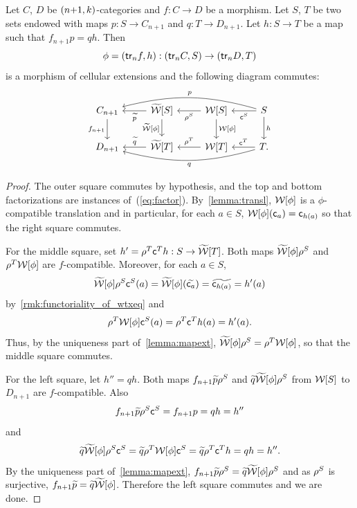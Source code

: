 \begin{lemma}\label{lemma:main_diagram}
    Let $C$, $D$ be $(n{+}1,k)$-categories and $f:C\to D$ be a
    morphism. Let $S$, $T$ be two sets endowed with maps $p:S\to
    C_{n+1}$ and $q:T\to D_{n+1}$. Let $h:S\to T$ be a map such that
    $f_{n+1}p=qh$. Then
    \[ \phi=(\mathsf{tr}_{n} f,h):(\mathsf{tr}_{n}
      C,S)\to(\mathsf{tr}_{n} D,T)\]
is a morphism of cellular extensions
    and the following diagram commutes:
    \begin{equation}
      \label{eq:main_diagram}
      \begin{tikzcd}
       C_{n+1} \ar[d,"f_{n+1}"']& \wtxeq S\ar[l,"\fcls{p}"]\ar[d,"\wtxeq\phi"'] & \wtx S
      \ar[l,"\cans{S}"]\ar[d,"\wtx\phi"] & S\ar[l,"\finc{S}"]\ar[d,"h"]
      \ar[lll,bend right=15,"p"']\\
      D_{n+1} & \wtxeq T\ar[l,"\fcls{q}"'] & \wtx T
      \ar[l,"\cans{T}"'] & T.\ar[l,"\finc{T}"'] \ar[lll,bend left=15,"q"]
      \end{tikzcd}
     \end{equation}
   \end{lemma}
   \begin{proof}
     The outer square commutes by hypothesis, and the top and bottom
     factorizations are instances
     of~(\ref{eq:factor}). By~\cref{lemma:transl}, $\mathcal{W}[\phi]$ is a
     $\phi$-compatible translation and in particular, for each $a\in
     S$, $\mathcal{W}[\phi](\mathsf{c}_{a})=\mathsf{c}_{h(a)}$ so that the right square
     commutes.

     For the middle square, set $h'=\rho^{T}\mathsf{c}^{T}h:S\to\widetilde{\mathcal{W}}[T]$. Both maps
     $\widetilde{\mathcal{W}}[\phi]\rho^{S}$ and $\rho^{T}\mathcal{W}[\phi]$ are
     $f$-compatible. Moreover, for each $a\in S$,
\[\widetilde{\mathcal{W}}[\phi]\rho^{S}\mathsf{c}^{S}(a)=\widetilde{\mathcal{W}}[\phi](\widetilde{\mathsf{c}_{a}})=\widetilde{\mathsf{c}_{h(a)}}=h'(a)\]
by~\cref{rmk:functoriality_of_wtxeq} and
\[
\rho^{T}\mathcal{W}[\phi]\mathsf{c}^{S}(a)=\rho^{T}\mathsf{c}^{T} h(a)=h'(a).
  \]
Thus, by the
     uniqueness part of~\cref{lemma:mapext}, $\widetilde{\mathcal{W}}[\phi]\rho^{S}=\rho^{T}\mathcal{W}[\phi]$, so that the middle square commutes.

     For the left square, let
     $h''=qh$. Both maps $f_{n+1}\widetilde{p}\rho^{S}$ and $\widetilde{q}\widetilde{\mathcal{W}}[\phi]\rho^{S}$ from $\mathcal{W}[S]$ to $D_{n+1}$ are $f$-compatible. Also
     \[
       f_{n+1}\widetilde{p}\rho^{S}\mathsf{c}^{S}=f_{n+1}p=qh=h''
     \]
      and
      \[
      \widetilde{q}\widetilde{\mathcal{W}}[\phi]\rho^{S}\mathsf{c}^{S}=\widetilde{q}\rho^{T}\mathcal{W}[\phi]\mathsf{c}^{S}=\widetilde{q}\rho^{T}\mathsf{c}^{T} h=qh=h''.
      \]
      By the uniqueness part
     of~\cref{lemma:mapext},
     $f_{n+1}\widetilde{p}\rho^{S}=\widetilde{q}\widetilde{\mathcal{W}}[\phi]\rho^{S}$ and as $\rho^{S}$
     is surjective, $f_{n+1}\widetilde{p}=\widetilde{q}\widetilde{\mathcal{W}}[\phi]$. Therefore the
     left square commutes and we are done.
   \end{proof}

